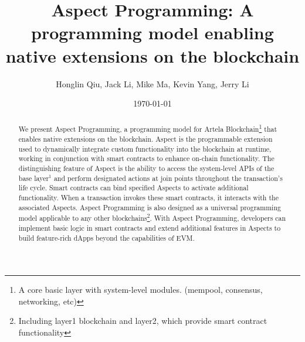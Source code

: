 \documentclass{article}
\begin{document}
\title{Aspect Programming: A programming model enabling native extensions on the blockchain}
\author{Honglin Qiu, Jack Li, Mike Ma, Kevin Yang, Jerry Li}
\date{\today}

\maketitle

\begin{abstract}
    We present Aspect Programming, a programming model for Artela Blockchain\footnote{A core basic layer with system-level modules. (mempool, consensus, networking, etc)} that enables native extensions on the blockchain. Aspect is the programmable extension used to dynamically integrate custom functionality into the blockchain at runtime, working in conjunction with smart contracts to enhance on-chain functionality. The distinguishing feature of Aspect is the ability to access the system-level APIs of the base layer$^1$ and perform designated actions at join points throughout the transaction's life cycle. Smart contracts can bind specified Aspects to activate additional functionality. When a transaction invokes these smart contracts, it interacts with the associated Aspects. Aspect Programming is also designed as a universal programming model applicable to any other blockchains\footnote{Including layer1 blockchain and layer2, which provide smart contract functionality}. With Aspect Programming, developers can implement basic logic in smart contracts and extend additional features in Aspects to build feature-rich dApps beyond the capabilities of EVM.
\end{abstract}













\end{document}
